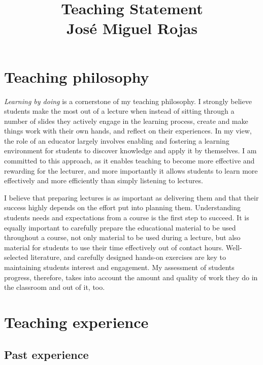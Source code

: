\documentclass[a4paper]{article}
\title{Teaching Statement\\{\Large Jos\'e Miguel Rojas}}
\date{}
\begin{document}
\maketitle



\section{Teaching philosophy}

\emph{Learning by doing} is a cornerstone of my teaching philosophy. I
strongly believe students make the most out of a lecture when instead
of sitting through a number of slides they actively engage in the
learning process, create and make things work with their own hands,
and reflect on their experiences. In my view, the role of an educator
largely involves enabling and fostering a learning environment for
students to discover knowledge and apply it by themselves. I am
committed to this approach, as it enables teaching to become more
effective and rewarding for the lecturer, and more importantly it
allows students to learn more effectively and more efficiently than
simply listening to lectures.

I believe that preparing lectures is as important as delivering them
and that their success highly depends on the effort put into planning
them. Understanding students needs and expectations from a course is
the first step to succeed. It is equally important to carefully
prepare the educational material to be used throughout a course, not
only material to be used during a lecture, but also material for
students to use their time effectively out of contact
hours. Well-selected literature, and carefully designed hands-on
exercises are key to maintaining students interest and engagement. My
assessment of students progress, therefore, takes into account the
amount and quality of work they do in the classroom and out of it,
too.

\section{Teaching experience}

\subsection{Past experience}
\end{document}
